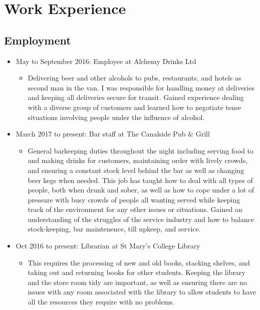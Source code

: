 \documentclass[10pt, a4paper]{article}
\begin{document}
\section{Work Experience}
	\subsection{Employment}
	\begin{itemize}
		\item May to September 2016: Employee at Alchemy Drinks Ltd
		\begin{itemize}
			\item Delivering beer and other alcohols to pubs, restaurants, and hotels as second man in the van. I was responsible for handling money at deliveries and keeping all deliveries secure for transit. Gained experience dealing with a diverse group of customers and learned how to negotiate tense situations involving people under the influence of alcohol.
		\end{itemize}
		\item March 2017 to present: Bar staff at The Canalside Pub \& Grill
		\begin{itemize}
			\item General barkeeping duties throughout the night including serving food to and making drinks for customers, maintaining order with lively crowds, and ensuring a constant stock level behind the bar as well as changing beer kegs when needed. This job has taught how to deal with all types of people, both when drunk and sober, as well as how to cope under a lot of pressure with busy crowds of people all wanting served while keeping track of the environment for any other issues or situations. Gained an understanding of the struggles of the service industry and how to balance stock-keeping, bar maintenence, till upkeep, and service.
		\end{itemize}
		\item Oct 2016 to present: Librarian at St Mary's College Library
		\begin{itemize}
			\item This requires the processing of new and old books, stacking shelves, and taking out and returning books for other students. Keeping the library and the store room tidy are important, as well as ensuring there are no issues with any room associated with the library to allow students to have all the resources they require with no problems.
		\end{itemize}
	\end{itemize}
\end{document}
